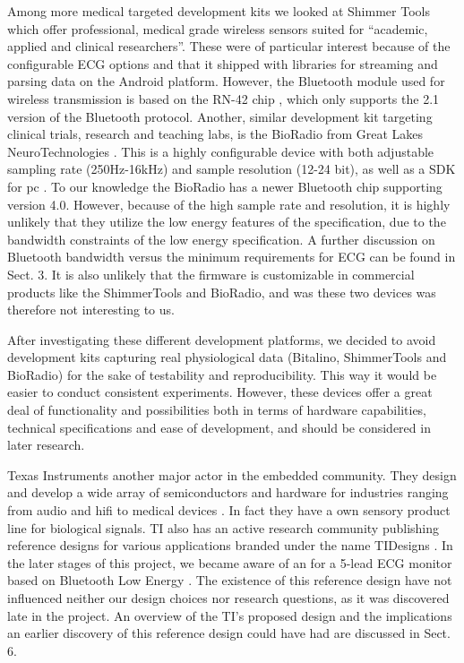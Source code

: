 Among more medical targeted development kits we looked at Shimmer Tools \cite{newRef_41} which offer professional, medical grade wireless sensors suited for ``academic, applied and clinical researchers''. These were of particular interest because of the configurable ECG options and that it shipped with libraries \cite{newRef_41} for streaming and parsing data on the Android platform. However, the Bluetooth module used for wireless transmission is based on the RN-42 chip \cite{newRef_43}, which only supports the 2.1 version of the Bluetooth protocol. Another, similar development kit targeting clinical trials, research and teaching labs, is the BioRadio from Great Lakes NeuroTechnologies \cite{newRef_44}. This is a highly configurable device with both adjustable sampling rate (250Hz-16kHz) and sample resolution (12-24 bit), as well as a SDK for pc \cite{newRef_45}. To our knowledge the BioRadio has a newer Bluetooth chip supporting version 4.0. However, because of the high sample rate and resolution, it is highly unlikely that they utilize the low energy features of the specification, due to the bandwidth constraints of the low energy specification. A further discussion on Bluetooth bandwidth versus the minimum requirements for ECG can be found in Sect. 3. It is also unlikely that the firmware is customizable in commercial products like the ShimmerTools and BioRadio, and was these two devices was therefore not interesting to us.

After investigating these different development platforms, we decided to avoid development kits capturing real physiological data (Bitalino, ShimmerTools and BioRadio) for the sake of testability and reproducibility. This way it would be easier to conduct consistent experiments. However, these devices offer a great deal of functionality and possibilities both in terms of hardware capabilities, technical specifications and ease of development, and should be considered in later research.

Texas Instruments another major actor in the embedded community. They design and develop a wide array of semiconductors and hardware for industries ranging from audio and hifi to medical devices \cite{newRef_46}. In fact they have a own sensory product line for biological signals. TI also has an active research community publishing reference designs for various applications branded under the name TIDesigns \cite{newRef_47}. In the later stages of this project, we became aware of an for a 5-lead ECG monitor based on Bluetooth Low Energy \cite{Anonymous:Q0qkTQkl}. The existence of this reference design have not influenced neither our design choices nor research questions, as it was discovered late in the project. An overview of the TI's proposed design and the implications an earlier discovery of this reference design could have had are discussed in Sect. 6.

